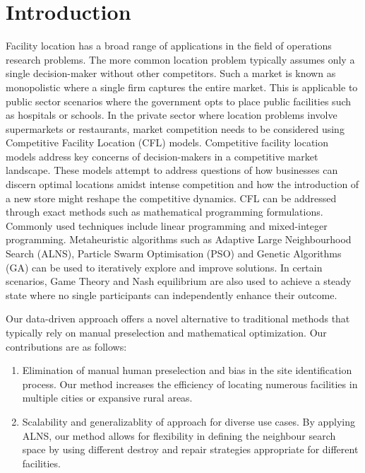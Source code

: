 \documentclass{ecai}
\begin{document}
\begin{frontmatter}
\begin{abstract}
\end{abstract}

\end{frontmatter}


\section{Introduction}
Facility location has a broad range of applications in the field of operations research problems. The more common location problem typically assumes only a single decision-maker without other competitors. Such a market is known as monopolistic where a single firm captures the entire market. This is applicable to public sector scenarios where the government opts to place public facilities such as hospitals or schools. In the private sector where location problems involve supermarkets or restaurants, market competition needs to be considered using Competitive Facility Location (CFL) models.
Competitive facility location models address key concerns of decision-makers in a competitive market landscape. These models attempt to address questions of how businesses can discern optimal locations amidst intense competition and how the introduction of a new store might reshape the competitive dynamics.
CFL can be addressed through exact methods such as mathematical programming formulations. Commonly used techniques include linear programming and mixed-integer programming. Metaheuristic algorithms such as Adaptive Large Neighbourhood Search (ALNS), Particle Swarm Optimisation (PSO) and Genetic Algorithms (GA) can be used to iteratively explore and improve solutions. In certain scenarios, Game Theory and Nash equilibrium are also used to achieve a steady state where no single participants can independently enhance their outcome.

Our data-driven approach offers a novel alternative to traditional methods that typically rely on manual preselection and mathematical optimization. Our contributions are as follows:
\begin{enumerate}
\item Elimination of manual human preselection and bias in the site identification process. Our method increases the efficiency of locating numerous facilities in multiple cities or expansive rural areas.
\item Scalability and generalizablity of approach for diverse use cases. By applying ALNS, our method allows for flexibility in defining the neighbour search space by using different destroy and repair strategies appropriate for different facilities.
\end{enumerate}
\end{document}
